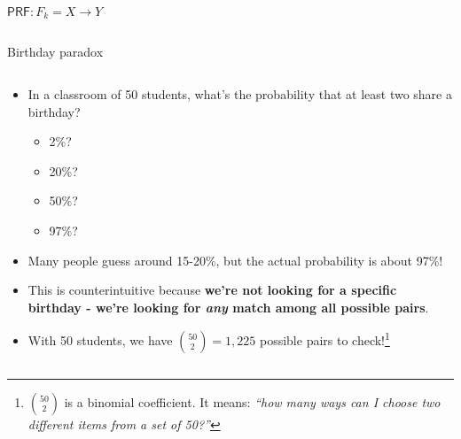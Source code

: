\documentclass[aspectratio=169, lualatex, handout]{beamer}
\begin{document}
\begin{frame}{$\mathsf{PRF}: F_{k}= X \rightarrow Y$}
\begin{columns}[c]
\begin{column}{0.8\textwidth}
		\end{column}
	\end{columns}
\end{frame}

\begin{frame}{Birthday paradox}
	\begin{columns}[c]
		\begin{column}{1\textwidth}
			\begin{itemize}[<+->]
				\item In a classroom of 50 students, what's the probability that at least two share a birthday?
				      \begin{itemize}
					      \item 2\%?
					      \item 20\%?
					      \item 50\%?
					      \item 97\%?
				      \end{itemize}
				\item Many people guess around 15-20\%, but the actual probability is about 97\%!
				\item This is counterintuitive because \textbf{we're not looking for a specific birthday - we're looking for \textit{any} match among all possible pairs}.
				\item With 50 students, we have $\binom{50}{2} = 1,225$ possible pairs to check!\footnote{$\binom{50}{2}$ is a binomial coefficient. It means: \textit{``how many ways can I choose two different items from a set of 50?''}}
			\end{itemize}
		\end{column}
	\end{columns}
\end{frame}
\end{document}

